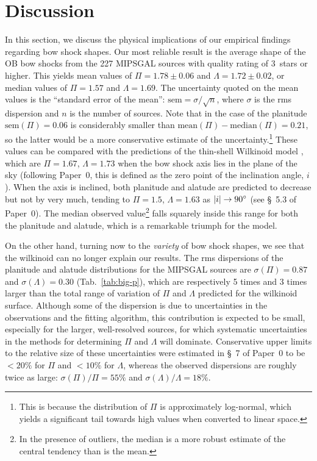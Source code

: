 
\section{Discussion}
\label{sec:discussion}

In this section, we discuss the physical implications of our empirical
findings regarding bow shock shapes.  Our most reliable result is the
average shape of the OB bow shocks from the 227 MIPSGAL sources with
quality rating of 3~stars or higher.  This yields mean values of
\(\Pi = 1.78 \pm 0.06\) and \(\Lambda = 1.72 \pm 0.02\), or median values of
\(\Pi = 1.57\) and \(\Lambda = 1.69\).  The uncertainty quoted on the mean
values is the ``standard error of the mean'':
\(\text{sem} = \sigma / \sqrt{n}\), where \(\sigma\) is the rms dispersion and
\(n\) is the number of sources.  Note that in the case of the
planitude \(\text{sem}(\Pi) = 0.06\) is considerably smaller than
\(\text{mean}(\Pi) - \text{median}(\Pi) = 0.21\), so the latter would be a
more conservative estimate of the uncertainty.\footnote{This is
  because the distribution of \(\Pi\) is approximately log-normal, which
  yields a significant tail towards high values when converted to
  linear space.}  These values can be compared with the predictions of
the thin-shell Wilkinoid model \citep{Wilkin:1996a}, which are
\(\Pi = 1.67\), \(\Lambda = 1.73\) when the bow shock axis lies in the plane
of the sky (following Paper~0, this is defined as the zero point of
the inclination angle, \(i\)).  When the axis is inclined, both
planitude and alatude are predicted to decrease but not by very much,
tending to \(\Pi = 1.5\), \(\Lambda = 1.63\) as
\(\lvert i\rvert \to \ang{90}\) (see \S~5.3 of Paper~0).  The median observed
value\footnote{In the presence of outliers, the median is a more
  robust estimate of the central tendency than is the mean.} falls
squarely inside this range for both the planitude and alatude, which
is a remarkable triumph for the \citet{Wilkin:1996a} model.

On the other hand, turning now to the \emph{variety} of bow shock
shapes, we see that the wilkinoid can no longer explain our results.
The rms dispersions of the planitude and alatude distributions for the
MIPSGAL sources are \(\sigma(\Pi) = 0.87\) and
\(\sigma(\Lambda) = 0.30\) (Tab.~\ref{tab:big-p}), which are respectively 5 times
and 3 times larger than the total range of variation of \(\Pi\) and
\(\Lambda\) predicted for the wilkinoid surface.  Although some of the
dispersion is due to uncertainties in the observations and the fitting
algorithm, this contribution is expected to be small, especially for
the larger, well-resolved sources, for which systematic uncertainties
in the methods for determining \(\Pi\) and \(\Lambda\) will
dominate. Conservative upper limits to the relative size of these
uncertainties were estimated in \S~7 of Paper~0 to be \(< 20\%\) for
\(\Pi\) and \(< 10\%\) for \(\Lambda\), whereas the observed dispersions are
roughly twice as large: \(\sigma(\Pi)/\Pi = 55\%\) and \(\sigma(\Lambda)/\Lambda = 18\%\).


